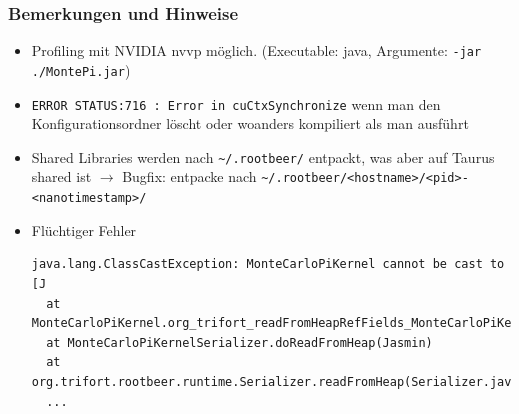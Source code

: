 \begin{frame}[fragile]
    \frametitle{Bemerkungen und Hinweise}
    \begin{itemize}
        \item Profiling mit NVIDIA nvvp möglich. (Executable: java, Argumente: \lstinline!-jar ./MontePi.jar!)
        \item \lstinline!ERROR STATUS:716 : Error in cuCtxSynchronize! wenn man den Konfigurationsordner löscht oder woanders kompiliert als man ausführt
        \item Shared Libraries werden nach \lstinline!~/.rootbeer/! entpackt, was aber auf Taurus shared ist $\rightarrow$ Bugfix: entpacke nach \lstinline!~/.rootbeer/<hostname>/<pid>-<nanotimestamp>/!
        \item Flüchtiger Fehler \begin{lstlisting}
java.lang.ClassCastException: MonteCarloPiKernel cannot be cast to [J
  at MonteCarloPiKernel.org_trifort_readFromHeapRefFields_MonteCarloPiKernel0(Jasmin)
  at MonteCarloPiKernelSerializer.doReadFromHeap(Jasmin)
  at org.trifort.rootbeer.runtime.Serializer.readFromHeap(Serializer.java:155)
  ...
\end{lstlisting}
    \end{itemize}
\end{frame}


